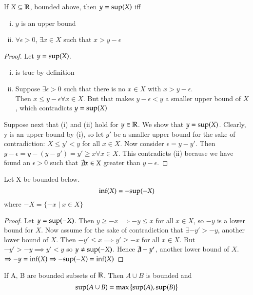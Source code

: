 \begin{proposition}
	If $X\subseteq \mathbb{R}$, bounded above, then $y = \mathrm{sup}(X)$ iff
	\begin{enumerate}[(i)]
		\item $y$ is an upper bound
		\item $\forall \epsilon > 0$, $\exists x\in X$ such that $x>y-\epsilon$
	\end{enumerate}
\end{proposition}
\begin{proof}
Let $y = \mathrm{sup}(X)$. \begin{enumerate}[(i)]
\item is true by definition
\item Suppose $\exists \epsilon > 0$ such that there is no $x\in X$ with $x>y-\epsilon$. \\
Then $x\leq y-\epsilon \forall x\in X$. But that makes $y-\epsilon < y$ a smaller upper bound of $X$, which contradicts $y=\mathrm{sup}(X)$
\end{enumerate}

Suppose next that (i) and (ii) hold for $y\in \mathbb{R}$. We show that $y = \mathrm{sup}(X)$. Clearly, y is an upper bound by (i), so let $y'$ be a smaller upper bound for the sake of contradiction: $X\leq y' < y$ for all $x\in X$. Now consider $\epsilon = y-y'$. Then $y-\epsilon = y- (y-y') = y' \geq x \forall x\in X$. This contradicts (ii) because we have found an $\epsilon > 0$ such that $\not \exists x \in X$ greater than $y-\epsilon$.
\end{proof}

\begin{proposition}
	Let X be bounded below.
	\[\mathrm{inf}(X) = -\mathrm{sup}(-X)\]
	where $-X = \{-x \mid x\in X\}$
\end{proposition}

\begin{proof}
	Let $y = \mathrm{sup} (-X)$. Then $y \geq -x \implies -y \leq x$ for all $x\in X$, so $-y$ is a lower bound for $X$. Now assume for the sake of contradiction that $\exists -y' > -y$, another lower bound of $X$. Then $-y' \leq x \implies y' \geq -x$ for all $x\in X$. But $-y' > -y \implies y' < y$ so $y \neq \mathrm{sup}(-X)$. Hence $\not \exists -y'$, another lower bound of $X$. $\Rightarrow -y = \mathrm{inf}(X) \Rightarrow -\mathrm{sup}(-X) = \mathrm{inf}(X)$
\end{proof}

\begin{proposition}\label{1.5}
	If A, B are bounded subsets of $\mathbb{R}$. Then $A\cup B$ is bounded and
	\[\mathrm{sup}(A\cup B) = \mathrm{max}\left\{ \mathrm{sup}(A), \mathrm{sup}(B) \right\}\]
\end{proposition}
